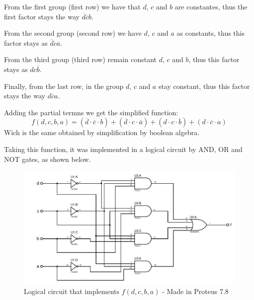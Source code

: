 \begin{centering}
    \begin{Karnaugh}
    \end{Karnaugh}
\par\end{centering}

From the first group (first row) we have that $d$, $c$ and $b$ 
are constantes, thus the first factor stays the way 
$ \overline{d} \overline{c} b$.\par
From the second group (second row) we have $d$, $c$ and $a$ as
constants, thus this factor stays as $ \overline{d} c \overline{a}$.\par
From the third group (third row) remain constant $d$, $c$ and $b$, thus 
this factor stays as $d c \overline{b}$.\par
Finally, from the last row, in the group $d$, $c$ and $a$ stay constant, 
thus this factor stays the way
$d \overline{c} a$.\par
Adding the partial termns we get the simplified function:
\[
    \boxed{f(d,c,b,a)=(\overline{d} \cdot \overline{c} \cdot b)+
    (\overline{d} \cdot c \cdot \overline{a})+
    (d \cdot c \cdot \overline{b})+
    (d \cdot \overline{c} \cdot a)}
\]
Wich is the same obtained by simplification by boolean algebra. \par
Taking this function, it was implemented in a logical circuit
 by AND, OR and NOT gates, as shown below.

\begin{figure}[H]
    \begin{centering}
    \includegraphics[width=1\textwidth]{ImplementacionEj2}
    \par\end{centering}
    \caption{Logical circuit that implements $f(d,c,b,a)$ - Made in Proteus 7.8}
\end{figure}

